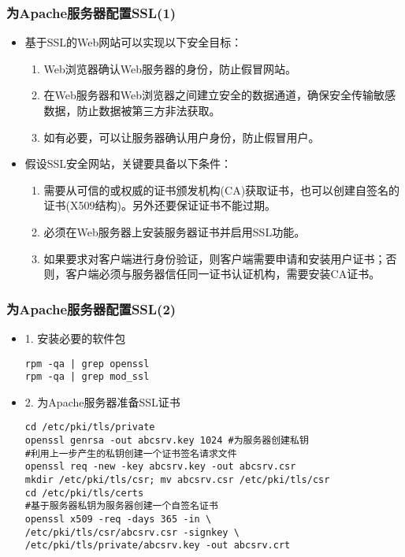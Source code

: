 \documentclass[xcolor=svgnames,presentation]{beamer}
\begin{document}
\begin{frame}
\frametitle{为Apache服务器配置SSL(1)}
\label{sec-4-5}
\begin{itemize}

\item 基于SSL的Web网站可以实现以下安全目标：
\label{sec-4-5-1}%
\begin{enumerate}
\item Web浏览器确认Web服务器的身份，防止假冒网站。
\item 在Web服务器和Web浏览器之间建立安全的数据通道，确保安全传输敏感数据，防止数据被第三方非法获取。
\item 如有必要，可以让服务器确认用户身份，防止假冒用户。
\end{enumerate}

\item 假设SSL安全网站，关键要具备以下条件：
\label{sec-4-5-2}%
\begin{enumerate}
\item 需要从可信的或权威的证书颁发机构(CA)获取证书，也可以创建自签名的证书(X509结构)。另外还要保证证书不能过期。
\item 必须在Web服务器上安装服务器证书并启用SSL功能。
\item 如果要求对客户端进行身份验证，则客户端需要申请和安装用户证书；否则，客户端必须与服务器信任同一证书认证机构，需要安装CA证书。
\end{enumerate}
\end{itemize} %
\end{frame}
\begin{frame}[fragile]
\frametitle{为Apache服务器配置SSL(2)}
\label{sec-4-6}
\begin{itemize}

\item 1. 安装必要的软件包\\
\label{sec-4-6-1}%
\begin{verbatim}
rpm -qa | grep openssl
rpm -qa | grep mod_ssl
\end{verbatim}

\item 2. 为Apache服务器准备SSL证书\\
\label{sec-4-6-2}%
\begin{verbatim}
cd /etc/pki/tls/private
openssl genrsa -out abcsrv.key 1024 #为服务器创建私钥
#利用上一步产生的私钥创建一个证书签名请求文件
openssl req -new -key abcsrv.key -out abcsrv.csr
mkdir /etc/pki/tls/csr; mv abcsrv.csr /etc/pki/tls/csr
cd /etc/pki/tls/certs
#基于服务器私钥为服务器创建一个自签名证书
openssl x509 -req -days 365 -in \
/etc/pki/tls/csr/abcsrv.csr -signkey \
/etc/pki/tls/private/abcsrv.key -out abcsrv.crt
\end{verbatim}
\end{itemize} %
\end{frame}
\end{document}
